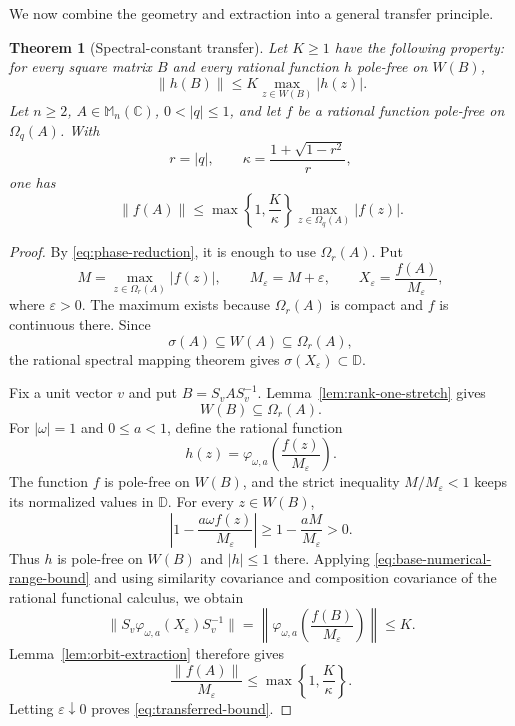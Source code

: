 \documentclass[preprints,article,submit,oneauthor]{Definitions/mdpi}
\newcounter{manuscriptresult}[section]
\theoremstyle{mdpi}
\newtheorem{theorem}[manuscriptresult]{Theorem}
\theoremstyle{definition}
\newcommand{\C}{\mathbb C}
\newcommand{\D}{\mathbb D}
\newcommand{\Mn}{\mathbb M_n(\C)}
\begin{document}
We now combine the geometry and extraction into a general transfer
principle.

\begin{theorem}[Spectral-constant transfer]
\label{thm:constant-transfer}
Let $K\geq1$ have the following property: for every square matrix $B$
and every rational function $h$ pole-free on $W(B)$,
\begin{equation}
 \lVert h(B)\rVert
 \leq K\max_{z\in W(B)}\lvert h(z)\rvert.
 \label{eq:base-numerical-range-bound}
\end{equation}
Let $n\geq2$, $A\in\Mn$, $0<\lvert q\rvert\leq1$, and let $f$ be
a rational function pole-free on $\Omega_q(A)$.  With
\[
 r=\lvert q\rvert,\qquad
 \kappa=\frac{1+\sqrt{1-r^2}}r,
\]
one has
\begin{equation}
 \lVert f(A)\rVert
 \leq
 \max\left\{1,\frac K\kappa\right\}
 \max_{z\in\Omega_q(A)}\lvert f(z)\rvert.
 \label{eq:transferred-bound}
\end{equation}
\end{theorem}

\begin{proof}
By \eqref{eq:phase-reduction}, it is enough to use $\Omega_r(A)$.
Put
\[
 M=\max_{z\in\Omega_r(A)}\lvert f(z)\rvert,\qquad
 M_\varepsilon=M+\varepsilon,\qquad
 X_\varepsilon=\frac{f(A)}{M_\varepsilon},
\]
where $\varepsilon>0$.  The maximum exists because $\Omega_r(A)$ is
compact and $f$ is continuous there.  Since
\[
 \sigma(A)\subseteq W(A)\subseteq\Omega_r(A),
\]
the rational spectral mapping theorem gives
$\sigma(X_\varepsilon)\subset\D$.

Fix a unit vector $v$ and put $B=S_vAS_v^{-1}$.
Lemma~\ref{lem:rank-one-stretch} gives
\[
 W(B)\subseteq\Omega_r(A).
\]
For $\lvert\omega\rvert=1$ and $0\leq a<1$, define the rational
function
\[
 h(z)=\varphi_{\omega,a}
      \left(\frac{f(z)}{M_\varepsilon}\right).
\]
The function $f$ is pole-free on $W(B)$, and the strict inequality
$M/M_\varepsilon<1$ keeps its normalized values in $\D$.  For every
$z\in W(B)$,
\[
 \left\lvert1-\frac{a\omega f(z)}{M_\varepsilon}\right\rvert
 \geq1-\frac{aM}{M_\varepsilon}>0.
\]
Thus $h$ is pole-free on $W(B)$ and $\lvert h\rvert\leq1$ there.
Applying
\eqref{eq:base-numerical-range-bound} and using similarity covariance
and composition covariance of the rational functional calculus, we
obtain
\[
 \lVert S_v\varphi_{\omega,a}(X_\varepsilon)S_v^{-1}\rVert
 =
 \left\|\varphi_{\omega,a}
  \left(\frac{f(B)}{M_\varepsilon}\right)\right\|
 \leq K.
\]
Lemma~\ref{lem:orbit-extraction} therefore gives
\[
 \frac{\lVert f(A)\rVert}{M_\varepsilon}
 \leq\max\left\{1,\frac K\kappa\right\}.
\]
Letting $\varepsilon\downarrow0$ proves
\eqref{eq:transferred-bound}.
\end{proof}
\end{document}
